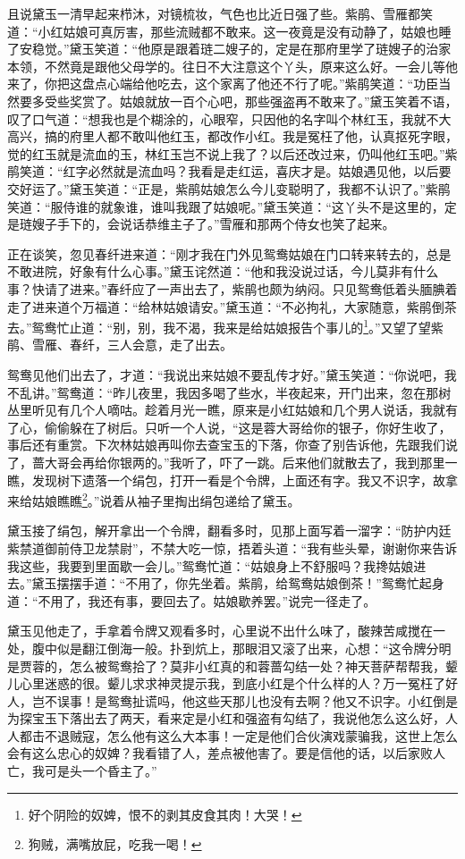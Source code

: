 \documentclass[12pt,oneside]{book}
\begin{document}
且说黛玉一清早起来栉沐，对镜梳妆，气色也比近日强了些。紫鹃、雪雁都笑道：“小红姑娘可真厉害，那些流贼都不敢来。这一夜竟是没有动静了，姑娘也睡了安稳觉。”黛玉笑道：“他原是跟着琏二嫂子的，定是在那府里学了琏嫂子的治家本领，不然竟是跟他父母学的。往日不大注意这个丫头，原来这么好。一会儿等他来了，你把这盘点心端给他吃去，这个家离了他还不行了呢。”紫鹃笑道：“功臣当然要多受些奖赏了。姑娘就放一百个心吧，那些强盗再不敢来了。”黛玉笑着不语，叹了口气道：“想我也是个糊涂的，心眼窄，只因他的名字叫个林红玉，我就不大高兴，搞的府里人都不敢叫他红玉，都改作小红。我是冤枉了他，认真抠死字眼，觉的红玉就是流血的玉，林红玉岂不说上我了？以后还改过来，仍叫他红玉吧。”紫鹃笑道：“红字必然就是流血吗？我看是走红运，喜庆才是。姑娘遇见他，以后要交好运了。”黛玉笑道：“正是，紫鹃姑娘怎么今儿变聪明了，我都不认识了。”紫鹃笑道：“服侍谁的就象谁，谁叫我跟了姑娘呢。”黛玉笑道：“这丫头不是这里的，定是琏嫂子手下的，会说话恭维主子了。”雪雁和那两个侍女也笑了起来。

正在谈笑，忽见春纤进来道：“刚才我在门外见鸳鸯姑娘在门口转来转去的，总是不敢进院，好象有什么心事。”黛玉诧然道：“他和我没说过话，今儿莫非有什么事？快请了进来。”春纤应了一声出去了，紫鹃也颇为纳闷。只见鸳鸯低着头腼腆着走了进来道个万福道：“给林姑娘请安。”黛玉道：“不必拘礼，大家随意，紫鹃倒茶去。”鸳鸯忙止道：“别，别，我不渴，我来是给姑娘报告个事儿的\footnote{好个阴险的奴婢，恨不的剥其皮食其肉！大哭！}。”又望了望紫鹃、雪雁、春纤，三人会意，走了出去。

鸳鸯见他们出去了，才道：“我说出来姑娘不要乱传才好。”黛玉笑道：“你说吧，我不乱讲。”鸳鸯道：“昨儿夜里，我因多喝了些水，半夜起来，开门出来，忽在那树丛里听见有几个人嘀咕。趁着月光一瞧，原来是小红姑娘和几个男人说话，我就有了心，偷偷躲在了树后。只听一个人说，“这是蓉大哥给你的银子，你好生收了，事后还有重赏。下次林姑娘再叫你去查宝玉的下落，你查了别告诉他，先跟我们说了，蔷大哥会再给你银两的。”我听了，吓了一跳。后来他们就散去了，我到那里一瞧，发现树下遗落一个绢包，打开一看是个令牌，上面还有字。我又不识字，故拿来给姑娘瞧瞧\footnote{狗贼，满嘴放屁，吃我一喝！}。”说着从袖子里掏出绢包递给了黛玉。

黛玉接了绢包，解开拿出一个令牌，翻看多时，见那上面写着一溜字：“防护内廷紫禁道御前侍卫龙禁尉”，不禁大吃一惊，捂着头道：“我有些头晕，谢谢你来告诉我这些，我要到里面歇一会儿。”鸳鸯忙道：“姑娘身上不舒服吗？我搀姑娘进去。”黛玉摆摆手道：“不用了，你先坐着。紫鹃，给鸳鸯姑娘倒茶！”鸳鸯忙起身道：“不用了，我还有事，要回去了。姑娘歇养罢。”说完一径走了。

黛玉见他走了，手拿着令牌又观看多时，心里说不出什么味了，酸辣苦咸搅在一处，腹中似是翻江倒海一般。扑到炕上，那眼泪又滚了出来，心想：“这令牌分明是贾蓉的，怎么被鸳鸯拾了？莫非小红真的和蓉蔷勾结一处？神天菩萨帮帮我，颦儿心里迷惑的很。颦儿求求神灵提示我，到底小红是个什么样的人？万一冤枉了好人，岂不误事！是鸳鸯扯谎吗，他这些天那儿也没有去啊？他又不识字。小红倒是为探宝玉下落出去了两天，看来定是小红和强盗有勾结了，我说他怎么这么好，人人都击不退贼寇，怎么他有这么大本事！一定是他们合伙演戏蒙骗我，这世上怎么会有这么忠心的奴婢？我看错了人，差点被他害了。要是信他的话，以后家败人亡，我可是头一个昏主了。”
\end{document}
